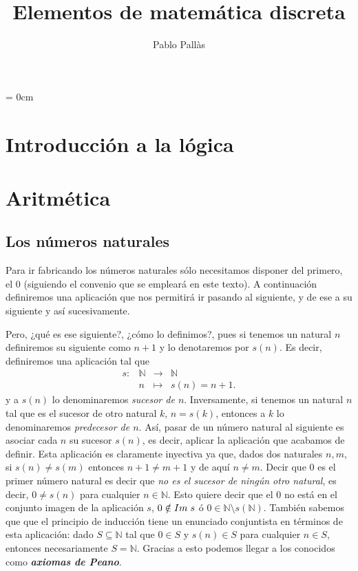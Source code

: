 \documentclass[12pt]{article}
\author{Pablo Pallàs}
\title{Elementos de matemática discreta}
\begin{document}
\rmfamily
\maketitle
\tableofcontents
\parindent= 0cm
\section{Introducción a la lógica}
\section{Aritmética}
\subsection{Los números naturales}
Para ir fabricando los números naturales sólo necesitamos disponer del primero, el $0$ (siguiendo el convenio que se empleará en este texto). A continuación definiremos una aplicación que nos permitirá ir pasando al siguiente, y de ese a su siguiente y así sucesivamente. 

Pero, ¿qué es ese siguiente?, ¿cómo lo definimos?, pues si tenemos un natural $n$ definiremos su siguiente como $n+1$ y lo denotaremos por $s(n)$. Es decir, definiremos una aplicación tal que $$\begin{array}{rccl}
s\colon &\mathbb{N}& \longrightarrow & \mathbb{N}\\
&n& \longmapsto &s(n)=n+1.
\end{array}
$$ y a $s(n)$ lo denominaremos \textit{sucesor de $n$}. Inversamente, si tenemos un natural $n$ tal que es el sucesor de otro natural $k$, $n=s(k)$, entonces a $k$ lo denominaremos \textit{predecesor de $n$}. Así, pasar de un número natural al siguiente es asociar cada $n$ su sucesor $s(n)$, es decir, aplicar la aplicación que acabamos de definir. Esta aplicación es claramente inyectiva ya que, dados dos naturales $n,m$, si $s(n) \neq s(m)$ entonces $n+1 \neq m +1$ y de aquí $n \neq m$. Decir que $0$ es el primer número natural es decir que \textit{no es el sucesor de ningún otro natural}, es decir, $0 \neq s(n)$ para cualquier $n \in \mathbb{N}$. Esto quiere decir que el $0$ no está en el conjunto imagen de la aplicación $s$, $0 \notin Im \hspace{0.1cm} s$ ó  $0 \in \mathbb{N} \setminus s(\mathbb{N})$. También sabemos que que el principio de inducción tiene un enunciado conjuntista en términos de esta aplicación: dado $S \subseteq \mathbb{N}$ tal que $0 \in S$ y $s(n) \in S$ para cualquier $n \in S$, entonces necesariamente $S = \mathbb{N}$. Gracias a esto podemos llegar a los conocidos como \textbf{\textit{axiomas de Peano}}.
\end{document}
